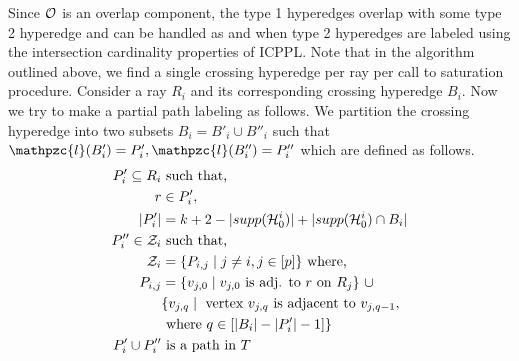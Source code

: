 \documentclass{CRPITStyle} %
\def\cH{{\cal H}}
\def\cO{{\cal O}}
\def\cZ{{\cal Z}}
\def\cl{\mathpzc{l}}
\def\xnoindent{} %
\begin{document}
\xnoindent Since $\cO$ is an overlap component, the type 1 hyperedges
overlap with some type 2 hyperedge and can be handled as and when type
2 hyperedges are labeled using the intersection cardinality properties
of ICPPL. Note that in the algorithm outlined above, we find a single
crossing hyperedge per ray per call to saturation procedure. Consider
a ray $R_i$ and its corresponding crossing hyperedge
$B_i$. Now we try to make a
partial path labeling as follows. We partition the crossing hyperedge
into two subsets $B_i = B'_i \cup B''_i$ such that $\cl(B'_i) = P_i',
\cl(B''_i) = P_i''$ which are defined as follows.
\begin{align*}
  P'_i \subseteq R_i & \text{ such that,} \\
  r &\in P'_i,\\
  |P'_i| &= k + 2 - |supp(\cH_0^i)| + 
  |supp(\cH_0^i) \cap B_i|\\
  P''_i \in \cZ_i & \text{ such that,} \\
  \cZ_i &= \{P_{i,j} \mid j \ne i, j \in [p]\} \text{ where,} \\
  P_{i,j} &= \{ v_{j,0} \mid v_{j,0} \text{ is adj. to $r$ on $R_j$}
  \} \text{ } \cup \\
  &\{v_{j,q} \mid \text{ vertex } v_{j,q} \text{ is adjacent to } v_{j,q-1}, \\
  &\text{ where } q \in [|B_i| - |P'_i|-1]\} \\
  P'_i \cup P''_i & \text{ is a path in $T$}
\end{align*}

\end{document}
